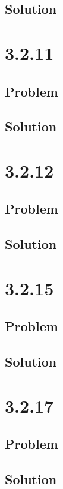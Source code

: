 \documentclass[12pt]{article}
\begin{document}
\subsection*{Solution}



\section*{3.2.11}

\subsection*{Problem}

\subsection*{Solution}



\section*{3.2.12}

\subsection*{Problem}

\subsection*{Solution}



\section*{3.2.15}

\subsection*{Problem}

\subsection*{Solution}



\section*{3.2.17}

\subsection*{Problem}

\subsection*{Solution}
\end{document}
